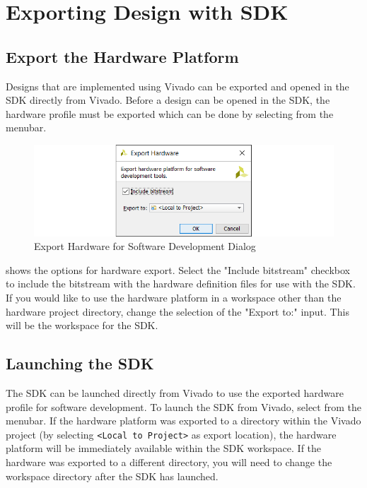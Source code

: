 \section{Exporting Design with SDK}

\subsection{Export the Hardware Platform}

Designs that are implemented using Vivado can be exported and opened in the SDK directly from Vivado. Before a design can be opened in the SDK, the hardware profile must be exported which can be done by selecting  from the menubar. \\


\begin{figure}
	\centering
	\includegraphics{images/vivado/export_dialog.png}
	\caption{Export Hardware for Software Development Dialog}
	\label{fig:exporthardwaredialog}
\end{figure}



 shows the options for hardware export. Select the "Include bitstream" checkbox to include the bitstream with the hardware definition files for use with the SDK. If you would like to use the hardware platform in a workspace other than the hardware project directory, change the selection of the "Export to:" input. This will be the workspace for the SDK. \\




\subsection{Launching the SDK}

The SDK can be launched directly from Vivado to use the exported hardware profile for software development. To launch the SDK from Vivado, select  from the menubar. If the hardware platform was exported to a directory within the Vivado project (by selecting \texttt{<Local to Project>} as export location), the hardware platform will be immediately available within the SDK workspace. If the hardware was exported to a different directory, you will need to change the workspace directory after the SDK has launched.
